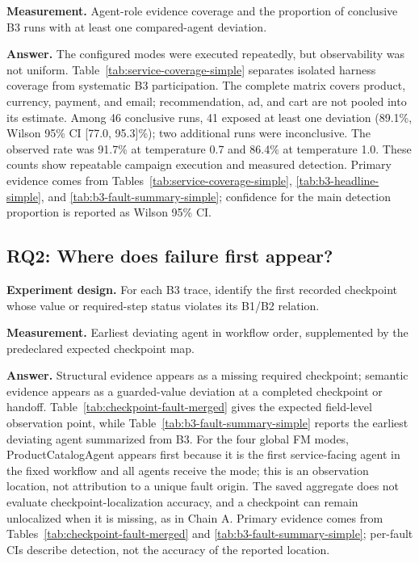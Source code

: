 \documentclass[sigconf,review,anonymous,balance=false]{acmart}
\begin{document}
\textbf{Measurement.} Agent-role evidence coverage and the proportion of
conclusive B3 runs with at least one compared-agent deviation.

\textbf{Answer.} The configured modes were executed repeatedly, but
observability was not uniform. Table~\ref{tab:service-coverage-simple}
separates isolated harness coverage from systematic B3 participation. The
complete matrix covers product, currency, payment, and email;
recommendation, ad, and cart are not pooled into its estimate.
Among 46 conclusive runs, 41 exposed at least one deviation (89.1\%, Wilson
95\% CI [77.0, 95.3]\%); two additional runs were inconclusive. The observed
rate was 91.7\% at temperature 0.7 and 86.4\% at temperature 1.0. These counts
show repeatable campaign execution and measured detection.
Primary evidence comes from Tables~\ref{tab:service-coverage-simple},
\ref{tab:b3-headline-simple}, and \ref{tab:b3-fault-summary-simple}; confidence
for the main detection proportion is reported as Wilson 95\% CI.

\subsection{RQ2: Where does failure first appear?}

\textbf{Experiment design.} For each B3 trace, identify the first recorded
checkpoint whose value or required-step status violates its B1/B2 relation.

\textbf{Measurement.} Earliest deviating agent in workflow order, supplemented
by the predeclared expected checkpoint map.

\textbf{Answer.} Structural evidence appears as a missing required checkpoint;
semantic evidence appears as a guarded-value deviation at a completed
checkpoint or handoff. Table~\ref{tab:checkpoint-fault-merged} gives the expected
field-level observation point, while Table~\ref{tab:b3-fault-summary-simple}
reports the earliest deviating agent summarized from B3. For the four global
FM modes, ProductCatalogAgent appears first because it is the first
service-facing agent in the fixed workflow and all agents receive the mode;
this is an observation location, not attribution to a unique fault origin.
The saved aggregate does not evaluate checkpoint-localization accuracy, and a
checkpoint can remain unlocalized when it is missing, as in Chain A.
Primary evidence comes from Tables~\ref{tab:checkpoint-fault-merged} and
\ref{tab:b3-fault-summary-simple}; per-fault CIs describe detection, not the
accuracy of the reported location.
\end{document}
